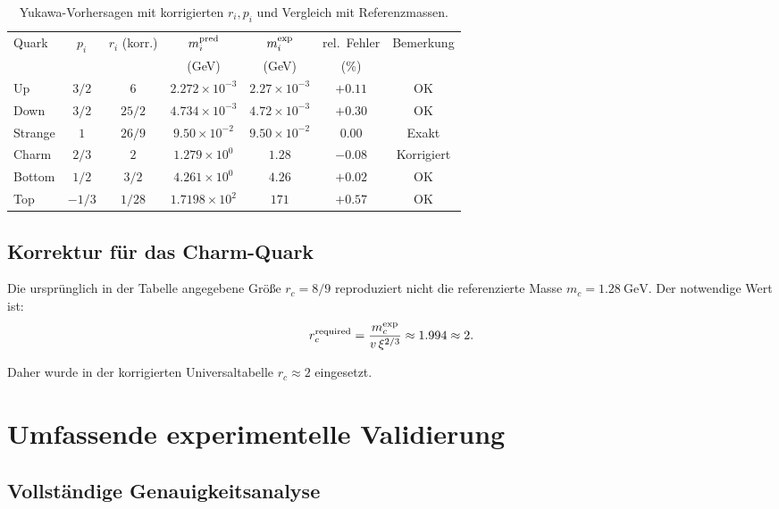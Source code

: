 \documentclass[12pt,a4paper]{article}
\begin{document}
	\begin{table}[h!]
		\centering
		\begin{tabular}{lcccccc}
			\toprule
			Quark & $p_i$ & $r_i$ (korr.) & $m_i^{\rm pred}$ & $m_i^{\rm exp}$ & rel.\ Fehler & Bemerkung\\
			& & & (GeV) & (GeV) & (\%) & \\
			\midrule
			Up     & $3/2$ & $6$        & $2.272\times10^{-3}$ & $2.27\times10^{-3}$ & $+0.11$ & OK \\
			Down   & $3/2$ & $25/2$     & $4.734\times10^{-3}$ & $4.72\times10^{-3}$ & $+0.30$ & OK \\
			Strange& $1$   & $26/9$        & $9.50\times10^{-2}$  & $9.50\times10^{-2}$  & $0.00$ & Exakt\\
			Charm  & $2/3$ & $2$      & $1.279\times10^{0}$  & $1.28$              & $-0.08$ & Korrigiert\\
			Bottom & $1/2$ & $3/2$      & $4.261\times10^{0}$   & $4.26$              & $+0.02$ & OK \\
			Top    & $-1/3$& $1/28$     & $1.7198\times10^{2}$  & $171$               & $+0.57$ & OK \\
			\bottomrule
		\end{tabular}
		\caption{Yukawa-Vorhersagen mit korrigierten $r_i,p_i$ und Vergleich mit Referenzmassen.}
	\end{table}
	
	\subsection{Korrektur für das Charm-Quark}
	\label{subsec:charm_correction}
	
	Die ursprünglich in der Tabelle angegebene Größe $r_c=8/9$ reproduziert nicht die referenzierte Masse $m_c=1.28\ \mathrm{GeV}$. Der notwendige Wert ist:
	\[
	r_c^{\rm required}=\frac{m_c^{\rm exp}}{v\,\xi^{2/3}}\approx 1.994 \approx 2.
	\]
	
	Daher wurde in der korrigierten Universaltabelle $r_c \approx 2$ eingesetzt.
	
	\section{Umfassende experimentelle Validierung}
	\label{sec:comprehensive_validation}
	
	\subsection{Vollständige Genauigkeitsanalyse}
	\label{subsec:complete_accuracy}
	
\end{document}
